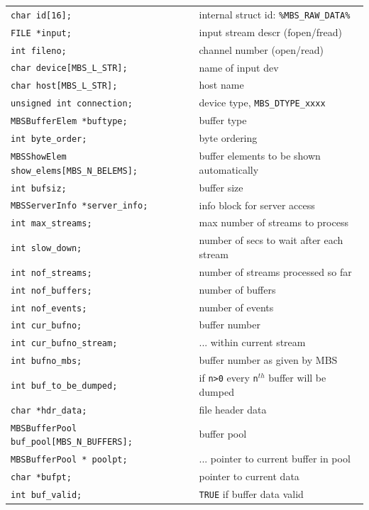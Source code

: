 \documentclass[10pt]{article}
\begin{document}
\begin{center}
\begin{tabular}{ll}
	\verb+char id[16];+ 				&		internal struct id: \verb+%MBS_RAW_DATA%+	\\
	\verb+FILE *input;+ 				&		input stream descr (fopen/fread)	\\
	\verb+int fileno;+				&		channel number (open/read)	\\
	\verb+char device[MBS_L_STR];+			&		name of input dev	\\
	\verb+char host[MBS_L_STR];+			&		host name	\\
	\verb+unsigned int connection;+ 		&		device type, \verb+MBS_DTYPE_xxxx+ \\
	\verb+MBSBufferElem *buftype;+			&		buffer type \\
	\verb+int byte_order;+				&		byte ordering	\\
	\verb+MBSShowElem show_elems[MBS_N_BELEMS];+	&		buffer elements to be shown automatically	\\
	\verb+int bufsiz;+				&		buffer size \\
	\verb+MBSServerInfo *server_info;+		&		info block for server access	\\
	\verb+int max_streams;+ 			&		max number of streams to process \\
	\verb+int slow_down;+				&		number of secs to wait after each stream \\
	\verb+int nof_streams;+ 			&		number of streams processed so far	\\
	\verb+int nof_buffers;+ 			&		number of buffers	\\
	\verb+int nof_events;+				&		number of events \\
	\verb+int cur_bufno;+				&		buffer number	\\
	\verb+int cur_bufno_stream;+			&		... within current stream	\\
	\verb+int bufno_mbs;+				&		buffer number as given by MBS	\\
	\verb+int buf_to_be_dumped;+			&		if \verb+n>0+ every \verb+n+$^{th}$ buffer will be dumped	\\
	\verb+char *hdr_data;+				&		file header data	\\
	\verb+MBSBufferPool buf_pool[MBS_N_BUFFERS];+	&		buffer pool \\
	\verb+MBSBufferPool * poolpt;+			&		... pointer to current buffer in pool	\\
	\verb+char *bufpt;+ 				&		pointer to current data \\
	\verb+int buf_valid;+				&		\verb+TRUE+ if buffer data valid	\\

\end{tabular}
\end{center}
\end{document}
